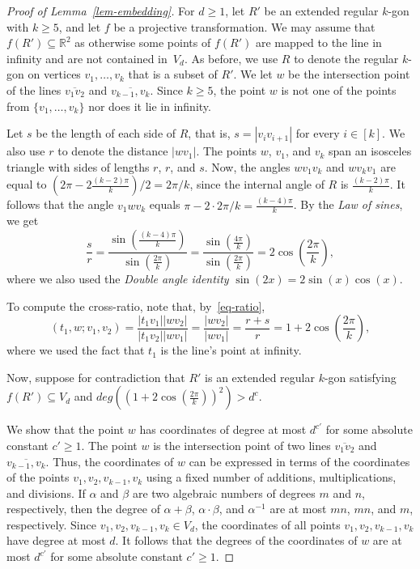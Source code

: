 \documentclass{article}
\begin{document}
\begin{proof}[Proof of Lemma~\ref{lem-embedding}]
For $d \geq 1$, let $R'$ be an extended regular $k$-gon with $k \geq 5$, and let $f$ be a projective transformation.
We may assume that $f(R') \subseteq \mathbb{R}^2$ as otherwise some points of $f(R')$ are mapped to the line in infinity and are not contained in~$V_d$.
As before, we use $R$ to denote the regular $k$-gon on vertices $v_1,\dots,v_k$ that is a subset of $R'$.
We let $w$ be the intersection point of the lines $\overline{v_1v_2}$ and $\overline{v_{k-1},v_k}$.
Since $k \geq 5$, the point $w$ is not one of the points from $\{v_1,\dots,v_k\}$ nor does it lie in infinity.

Let $s$ be the length of each side of $R$, that is, $s=|v_iv_{i+1}|$ for every $i \in [k]$.
We also use $r$ to denote the distance $|wv_1|$.
The points $w$, $v_1$, and $v_k$ span an isosceles triangle with sides of lengths $r$, $r$, and $s$.
Now, the angles $wv_1v_k$ and $wv_kv_1$ are equal to $(2\pi - 2\frac{(k-2)\pi}{k})/2=2\pi/k$, since the internal angle of $R$ is $\frac{(k-2)\pi}{k}$.
It follows that the angle $v_1wv_k$ equals $\pi - 2 \cdot 2\pi/k = \frac{(k-4)\pi}{k}$.
By the \emph{Law of sines}, we get
\begin{equation}
\label{eq-ratio}
\frac{s}{r} = \frac{\sin\left(\frac{(k-4)\pi}{k}\right)}{\sin\left(\frac{2\pi}{k}\right)} = \frac{\sin\left(\frac{4\pi}{k}\right)}{\sin\left(\frac{2\pi}{k}\right)} = 2\cos\left(\frac{2\pi}{k}\right),
\end{equation}
where we also used the \emph{Double angle identity} $\sin(2x) = 2\sin(x)\cos(x)$.

To compute the cross-ratio, note that, by~\eqref{eq-ratio},
\begin{equation}
\label{eq-crossRatio}
(t_1,w;v_1,v_2) = \frac{|t_1v_1||wv_2|}{|t_1v_2||wv_1|} = \frac{|wv_2|}{|wv_1|} = \frac{r+s}{r} = 1+2\cos\left(\frac{2\pi}{k}\right),
\end{equation}
where we used the fact that $t_1$ is the line's point at infinity.

Now, suppose for contradiction that $R'$ is an extended regular $k$-gon satisfying $f(R') \subseteq V_d$ and $deg\left(\left(1+2\cos\left(\frac{2\pi}{k}\right)\right)^2\right) > d^c$.

We show that the point $w$ has coordinates of degree at most $d^{c'}$ for some absolute constant $c' \geq 1$.
The point $w$ is the intersection point of two lines $\overline{v_1v_2}$ and $\overline{v_{k-1},v_k}$. 
Thus, the coordinates of $w$ can be expressed in terms of the coordinates of the points $v_1,v_2,v_{k-1},v_k$ using a fixed number of additions, multiplications, and divisions.
If $\alpha$ and $\beta$ are two algebraic numbers of degrees $m$ and $n$, respectively, then the degree of $\alpha + \beta$, $\alpha \cdot \beta$, and $\alpha^{-1}$ are at most $mn$, $mn$, and $m$, respectively.
Since $v_1,v_2,v_{k-1},v_k \in V_d$, the coordinates of all points $v_1,v_2,v_{k-1},v_k$ have degree at most $d$.
It follows that the degrees of the coordinates of $w$ are at most $d^{c'}$ for some absolute constant $c' \geq 1$.


\end{proof}
\end{document}

